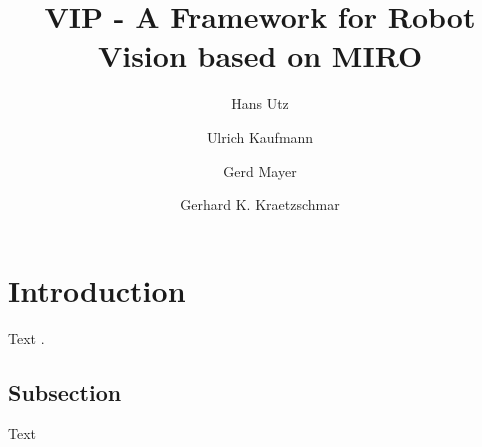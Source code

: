 %
%
%
%









%

\title*{VIP - A Framework for Robot Vision based on MIRO}
\author{Hans Utz\and Ulrich Kaufmann
\and Gerd Mayer \and Gerhard K. Kraetzschmar }
%
%
\maketitle

\section{Introduction}
\label{sec:ch35-Intro}

Text \cite{35_castek00component}.


\subsection{Subsection}
\label{sec:ch35-subsection}

Text



%

